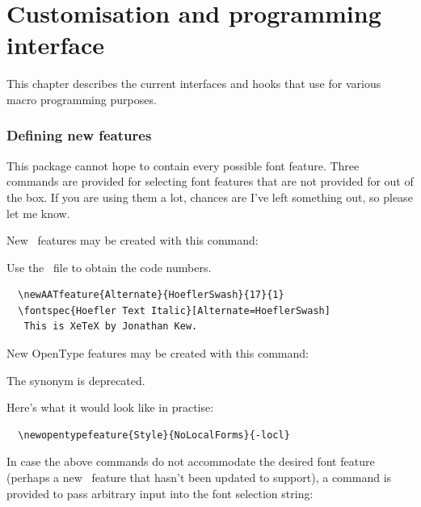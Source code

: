 \documentclass[a4paper]{l3doc}
\begin{document}
\part{Customisation and programming interface}

This chapter describes the current interfaces and hooks that use
 for various macro programming purposes.


\section{Defining new features} \label{sec:newfeatures}
This package cannot hope to contain every possible font
feature. Three commands are provided for selecting font features
that are not provided for out of the box. If you are using
them a lot, chances are I've left something out, so please let me
know.

\DescribeMacro{\newAATfeature}
New \AAT\ features may be created with this command:\par
{\centering\cmd\newAATfeature{}\par}\noindent
Use the \XeTeX\ file  to obtain the code numbers.
\begin{Verbatim}
  \newAATfeature{Alternate}{HoeflerSwash}{17}{1}
  \fontspec{Hoefler Text Italic}[Alternate=HoeflerSwash]
   This is XeTeX by Jonathan Kew.
\end{Verbatim}


\DescribeMacro{\newopentypefeature}
New OpenType features may be created with this command:\par
{\centering\cmd\newopentypefeature{}\par}
The synonym  is deprecated.

Here's what it would look like in practise:
\begin{Verbatim}
  \newopentypefeature{Style}{NoLocalForms}{-locl}
\end{Verbatim}

\DescribeMacro{\newfontfeature}
In case the above commands do not accommodate the desired font feature
(perhaps a new \XeTeX\ feature that  hasn't been updated
to support), a command is provided to pass arbitrary input into the
font selection string:\par
{\centering\cmd{\newfontfeature}\par}
\end{document}
